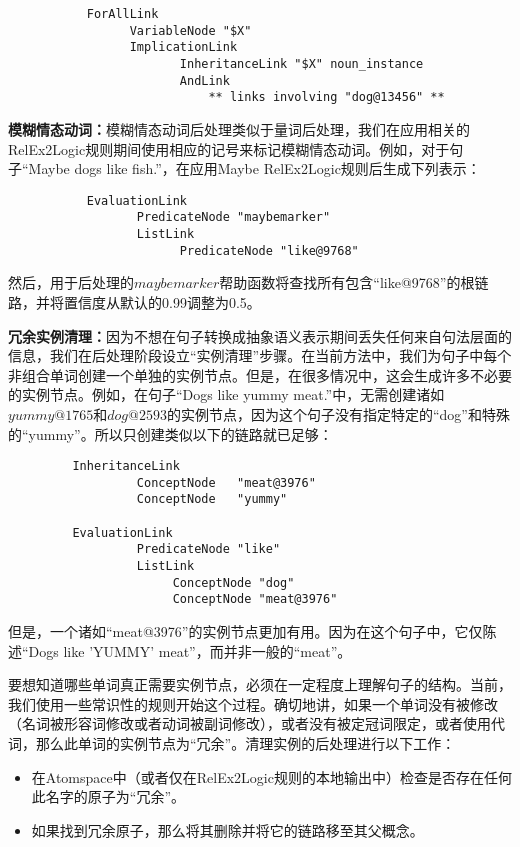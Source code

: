 \begin{verbatim}
           ForAllLink
                 VariableNode "$X"
                 ImplicationLink 
                        InheritanceLink "$X" noun_instance
                        AndLink
                            ** links involving "dog@13456" **
\end{verbatim}

{\bf 模糊情态动词：}模糊情态动词后处理类似于量词后处理，我们在应用相关的RelEx2Logic规则期间使用相应的记号来标记模糊情态动词。例如，对于句子“Maybe dogs like fish.”，在应用Maybe RelEx2Logic规则后生成下列表示：

\begin{verbatim}
           EvaluationLink
                  PredicateNode "maybemarker"
                  ListLink
                        PredicateNode "like@9768"
\end{verbatim}

然后，用于后处理的$maybemarker$帮助函数将查找所有包含“like@9768”的根链路，并将置信度从默认的0.99调整为0.5。

{\bf 冗余实例清理：}因为不想在句子转换成抽象语义表示期间丢失任何来自句法层面的信息，我们在后处理阶段设立“实例清理”步骤。在当前方法中，我们为句子中每个非组合单词创建一个单独的实例节点。但是，在很多情况中，这会生成许多不必要的实例节点。例如，在句子“Dogs like yummy meat.”中，无需创建诸如$yummy@1765$和$dog@2593$的实例节点，因为这个句子没有指定特定的“dog”和特殊的“yummy”。所以只创建类似以下的链路就已足够：

\begin{verbatim}
         InheritanceLink 
                  ConceptNode   "meat@3976" 
                  ConceptNode   "yummy"

         EvaluationLink 
                  PredicateNode "like"
                  ListLink
                       ConceptNode "dog"
                       ConceptNode "meat@3976"
\end{verbatim}

但是，一个诸如“meat@3976”的实例节点更加有用。因为在这个句子中，它仅陈述“Dogs like ’YUMMY’ meat”，而并非一般的“meat”。

要想知道哪些单词真正需要实例节点，必须在一定程度上理解句子的结构。当前，我们使用一些常识性的规则开始这个过程。确切地讲，如果一个单词没有被修改（名词被形容词修改或者动词被副词修改），或者没有被定冠词限定，或者使用代词，那么此单词的实例节点为“冗余”。清理实例的后处理进行以下工作：

\begin{itemize}
\item 在Atomspace中（或者仅在RelEx2Logic规则的本地输出中）检查是否存在任何此名字的原子为“冗余”。
\item 如果找到冗余原子，那么将其删除并将它的链路移至其父概念。
\end{itemize}

